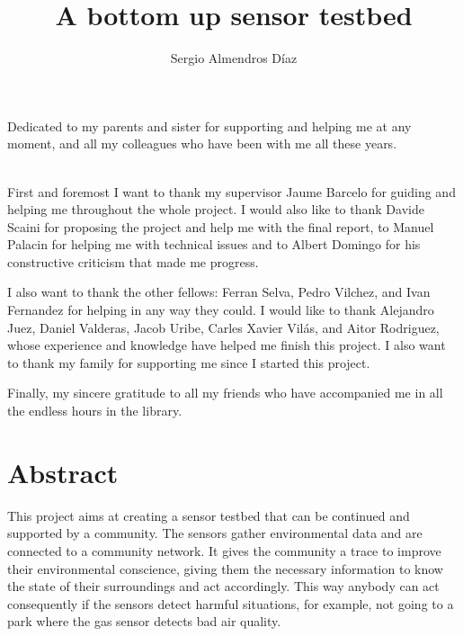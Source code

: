 \documentclass[12pt, a4paper,twoside]{tesi_upf}
\title{A bottom up sensor testbed}
\author{Sergio Almendros Díaz}
\begin{document}
\pdfstringdefDisableCommands{%
\let\MakeUppercase\relax
}

\frontmatter

\maketitle

\cleardoublepage



\noindent Dedicated to my parents and sister for supporting and helping me at any moment, and all my colleagues who have been with me all these years.

\cleardoublepage




\\

	First and foremost I want to thank my supervisor Jaume Barcelo for guiding and helping me throughout the whole project. I would also like to thank Davide Scaini for proposing the project and help me with the final report, to Manuel Palacin for helping me with technical issues and to Albert Domingo for his constructive criticism that made me progress.

	I also want to thank the other fellows: Ferran Selva, Pedro Vilchez, and Ivan Fernandez for helping in any way they could. 
	I would like to thank Alejandro Juez, Daniel Valderas, Jacob Uribe, Carles Xavier Vilás, and Aitor Rodriguez, whose experience and knowledge have helped me finish this project. 
	I also want to thank my family for supporting me since I started this project.

	Finally, my sincere gratitude to all my friends who have accompanied me in all the endless hours in the library.

\cleardoublepage


\section*{\Large \sffamily Abstract}
 
  This project aims at creating a sensor testbed that can be continued and supported by a community. 
  The sensors gather environmental data and are connected to a community network. It gives the community a trace to improve their environmental conscience, giving them the necessary information to know the state of their surroundings and act accordingly.
  This way anybody can act consequently if the sensors detect harmful situations, for example, not going to a park where the gas sensor detects bad air quality.
  
\end{document}
